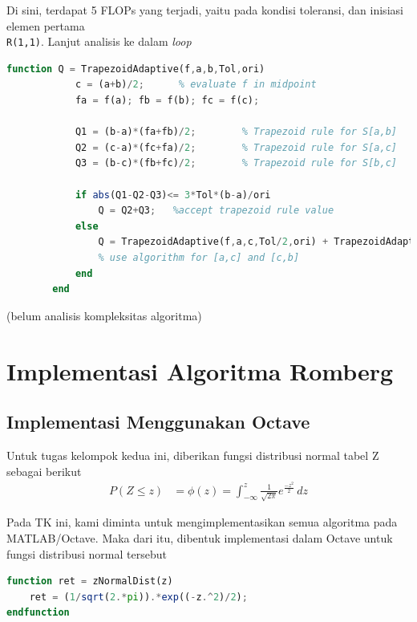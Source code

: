 \documentclass[journal,12pt,onecolumn,a4paper]{IEEEtran}
\begin{document}
Di sini, terdapat 5 FLOPs yang terjadi, yaitu pada kondisi toleransi, dan inisiasi elemen pertama \\ \lstinline{R(1,1)}. Lanjut analisis ke dalam \emph{loop}
\begin{center}
	\begin{lstlisting}[language=Octave]
		function Q = TrapezoidAdaptive(f,a,b,Tol,ori)
			c = (a+b)/2;      % evaluate f in midpoint
			fa = f(a); fb = f(b); fc = f(c);

			Q1 = (b-a)*(fa+fb)/2;        % Trapezoid rule for S[a,b]
			Q2 = (c-a)*(fc+fa)/2;        % Trapezoid rule for S[a,c]
			Q3 = (b-c)*(fb+fc)/2;        % Trapezoid rule for S[b,c]

			if abs(Q1-Q2-Q3)<= 3*Tol*(b-a)/ori
				Q = Q2+Q3;   %accept trapezoid rule value
			else
				Q = TrapezoidAdaptive(f,a,c,Tol/2,ori) + TrapezoidAdaptive(f,c,b,Tol/2,ori);
				% use algorithm for [a,c] and [c,b]
			end
		end
	\end{lstlisting}
\end{center}

(belum analisis kompleksitas algoritma)

\section{Implementasi Algoritma Romberg}

\subsection{Implementasi Menggunakan Octave}

\par Untuk tugas kelompok kedua ini, diberikan fungsi distribusi normal tabel Z sebagai berikut
\begin{equation*}
	\begin{split}
		P(Z \le z ) & = \phi(z) = \int_{-\infty}^{z} \frac{1}{\sqrt{2\pi}}e ^{\frac{-z^2}{2}} \,dz
	\end{split}
\end{equation*}

Pada TK ini, kami diminta untuk mengimplementasikan semua algoritma pada MATLAB/Octave. Maka dari itu, dibentuk implementasi dalam Octave untuk fungsi distribusi normal tersebut

\begin{center}
	\begin{lstlisting}[language=Octave]
function ret = zNormalDist(z)
	ret = (1/sqrt(2.*pi)).*exp((-z.^2)/2);
endfunction
	\end{lstlisting}
\end{center}
\end{document}
